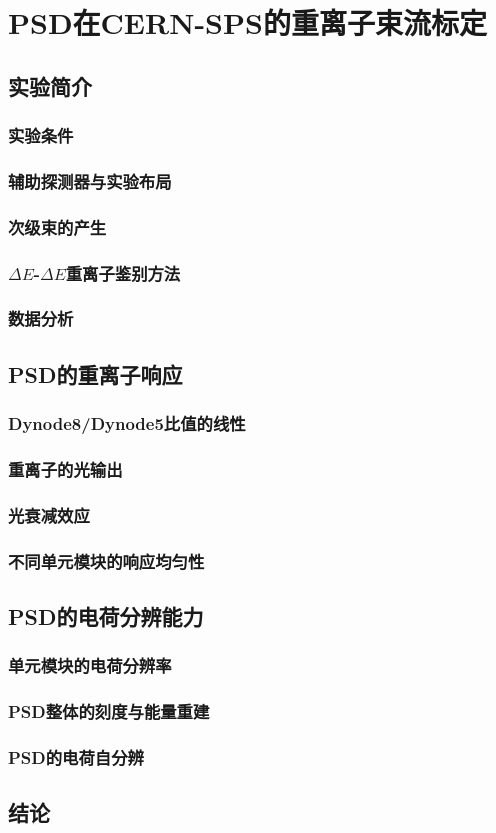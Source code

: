\chapter{PSD在CERN-SPS的重离子束流标定}

\section{实验简介}
\subsection{实验条件}
\subsection{辅助探测器与实验布局}
\subsection{次级束的产生}
\subsection{$\Delta E$-$\Delta E$重离子鉴别方法}
\subsection{数据分析}

\section{PSD的重离子响应}
\subsection{Dynode8/Dynode5比值的线性}
\subsection{重离子的光输出}
\subsection{光衰减效应}
\subsection{不同单元模块的响应均匀性}

\section{PSD的电荷分辨能力}
\subsection{单元模块的电荷分辨率}
\subsection{PSD整体的刻度与能量重建}
\subsection{PSD的电荷自分辨}

\section{结论}